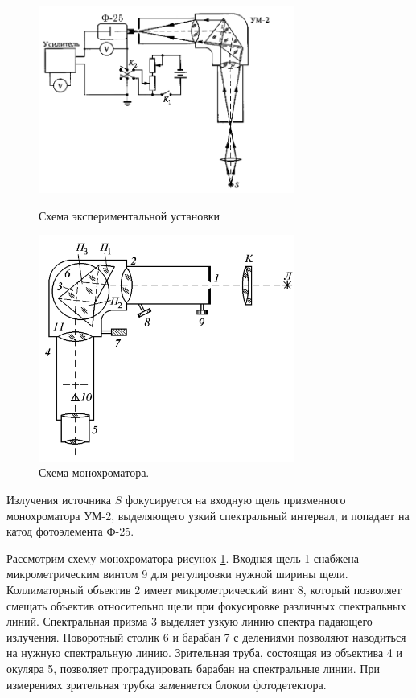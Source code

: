 \documentclass[a4paper, 12pt]{article}
\begin{document}
	\begin{figure}[H]
		\centering
		\begin{minipage}[c]{0.48\textwidth}
			\centering
			\includegraphics[width = 0.75\textwidth]{images/installation_1.png}
			\caption{Схема экспериментальной установки}
			\label{img:installation_1}
		\end{minipage}
		\hfill
		\begin{minipage}[c]{0.48\textwidth}
			\centering
			\includegraphics[width = 0.75\textwidth]{images/installation_2.png}
			\caption{Схема монохроматора.}
			\label{img:installation_2}
		\end{minipage}
	\end{figure}

	Излучения источника $S$ фокусируется на входную щель призменного монохроматора УМ-2, выделяющего узкий спектральный интервал, и попадает на катод фотоэлемента Ф-25.
	
	Рассмотрим схему монохроматора рисунок \ref{img:installation_2}. Входная щель 1 снабжена микрометрическим винтом 9 для регулировки нужной ширины щели. Коллиматорный объектив 2 имеет микрометрический винт 8, который позволяет смещать объектив относительно щели при фокусировке различных спектральных линий. Спектральная призма 3 выделяет узкую линию спектра падающего излучения. Поворотный столик 6 и барабан 7 с делениями позволяют наводиться на нужную спектральную линию. Зрительная труба, состоящая из объектива 4 и окуляра 5, позволяет проградуировать барабан на спектральные линии. При измерениях зрительная трубка заменяется блоком фотодетектора. 
	
\end{document}
